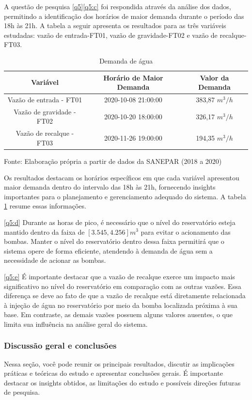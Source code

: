 A questão de pesquisa \ref{q5}\ref{q5:c} foi respondida através da análise dos dados, permitindo a identificação dos horários de maior demanda durante o período das 18h às 21h. A tabela a seguir apresenta os resultados para as três variáveis estudadas: vazão de entrada-FT01, vazão de gravidade-FT02 e vazão de recalque-FT03.

\begin{table}[H]
	\centering
	\caption{Demanda de água}\label{tb:dem}
	\begin{tabular}{@{}ccc@{}}
		\toprule
		\textbf{Variável}         & \textbf{Horário de Maior Demanda} & \textbf{Valor da Demanda} \\ \midrule
		Vazão de entrada - FT01   & 2020-10-08 21:00:00               & 383,87 $m^3/h$                   \\
		Vazão de gravidade - FT02 & 2020-10-20 18:00:00               & 326,17 $m^3/h$                    \\
		Vazão de recalque - FT03  & 2020-11-26 19:00:00               & 194,35 $m^3/h$                    \\ \bottomrule
	\end{tabular}
	
	
	Fonte: Elaboração própria a partir de dados da SANEPAR (2018 a 2020)
\end{table}

Os resultados destacam os horários específicos em que cada variável apresentou maior demanda dentro do intervalo das 18h às 21h, fornecendo insights importantes para o planejamento e gerenciamento adequado do sistema. A tabela \ref{tb:dem} resume essas informações.


\ref{q5:d} Durante as horas de pico, é necessário que o nível do reservatório esteja mantido dentro da faixa de $[3.545, 4.256] m^3$ para evitar o acionamento das bombas. Manter o nível do reservatório dentro dessa faixa permitirá que o sistema opere de forma eficiente, atendendo à demanda de água sem a necessidade de acionar as bombas.

\ref{q5:e} É importante destacar que a vazão de recalque exerce um impacto mais significativo no nível do reservatório em comparação com as outras vazões. Essa diferença se deve ao fato de que a vazão de recalque está diretamente relacionada à injeção de água no reservatório por meio da bomba localizada próxima à sua base. Em contraste, as demais vazões possuem alguns valores ausentes, o que limita sua influência na análise geral do sistema.



\subsubsection{Discuss\~ao geral e conclus\~oes}
Nessa seção, você pode reunir os principais resultados, discutir as implicações práticas e teóricas do estudo e apresentar conclusões gerais. É importante destacar os insights obtidos, as limitações do estudo e possíveis direções futuras de pesquisa.


